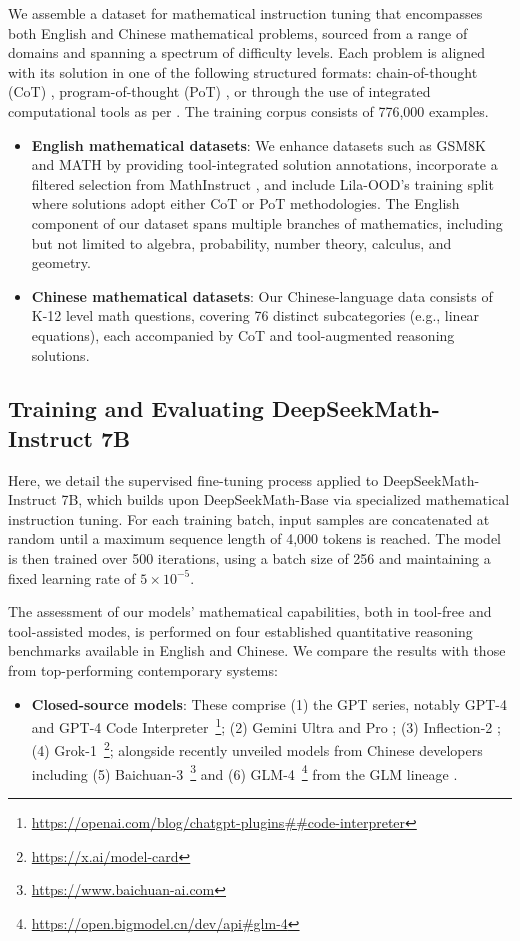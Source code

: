 We assemble a dataset for mathematical instruction tuning that encompasses both English and Chinese mathematical problems, sourced from a range of domains and spanning a spectrum of difficulty levels. Each problem is aligned with its solution in one of the following structured formats: chain-of-thought (CoT) \citep{cot}, program-of-thought (PoT) \citep{pot,pal}, or through the use of integrated computational tools as per \citep{tora}. The training corpus consists of 776,000 examples.

\begin{itemize}[topsep=0pt]
    \item \textbf{English mathematical datasets}: We enhance datasets such as GSM8K and MATH by providing tool-integrated solution annotations, incorporate a filtered selection from MathInstruct \citep{MathInstruct}, and include Lila-OOD’s training split \citep{lila} where solutions adopt either CoT or PoT methodologies. The English component of our dataset spans multiple branches of mathematics, including but not limited to algebra, probability, number theory, calculus, and geometry.
    \item \textbf{Chinese mathematical datasets}: Our Chinese-language data consists of K-12 level math questions, covering 76 distinct subcategories (e.g., linear equations), each accompanied by CoT and tool-augmented reasoning solutions.
\end{itemize}

\subsection{Training and Evaluating DeepSeekMath-Instruct 7B}

Here, we detail the supervised fine-tuning process applied to DeepSeekMath-Instruct 7B, which builds upon DeepSeekMath-Base via specialized mathematical instruction tuning. For each training batch, input samples are concatenated at random until a maximum sequence length of 4,000 tokens is reached. The model is then trained over 500 iterations, using a batch size of 256 and maintaining a fixed learning rate of $5 \times 10^{-5}$.

The assessment of our models’ mathematical capabilities, both in tool-free and tool-assisted modes, is performed on four established quantitative reasoning benchmarks available in English and Chinese. We compare the results with those from top-performing contemporary systems:

\begin{itemize}[topsep=0pt]
    \item \textbf{Closed-source models}: These comprise (1) the GPT series, notably GPT-4 \citep{gpt4} and GPT-4 Code Interpreter~\footnote{\url{https://openai.com/blog/chatgpt-plugins\#\#code-interpreter}}; (2) Gemini Ultra and Pro \citep{gemini}; (3) Inflection-2 \citep{inflection-2}; (4) Grok-1~\footnote{\url{https://x.ai/model-card}}; alongside recently unveiled models from Chinese developers including (5) Baichuan-3~\footnote{\url{https://www.baichuan-ai.com}} and (6) GLM-4~\footnote{\url{https://open.bigmodel.cn/dev/api\#glm-4}} from the GLM lineage \citep{glm}.
\end{itemize}

